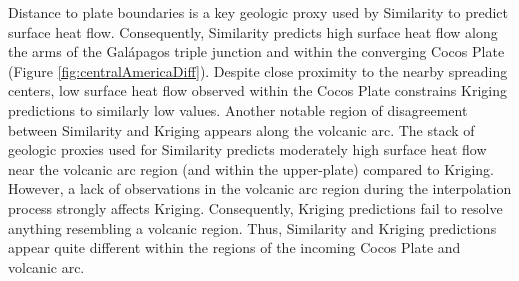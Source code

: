 Distance to plate boundaries is a key geologic proxy used by Similarity to predict surface heat flow. Consequently, Similarity predicts high surface heat flow along the arms of the Galápagos triple junction and within the converging Cocos Plate (Figure \ref{fig:centralAmericaDiff}). Despite close proximity to the nearby spreading centers, low surface heat flow observed within the Cocos Plate constrains Kriging predictions to similarly low values. Another notable region of disagreement between Similarity and Kriging appears along the volcanic arc. The stack of geologic proxies used for Similarity predicts moderately high surface heat flow near the volcanic arc region (and within the upper-plate) compared to Kriging. However, a lack of observations in the volcanic arc region during the interpolation process strongly affects Kriging. Consequently, Kriging predictions fail to resolve anything resembling a volcanic region. Thus, Similarity and Kriging predictions appear quite different within the regions of the incoming Cocos Plate and volcanic arc.



